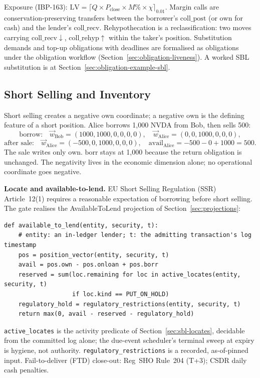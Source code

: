 Exposure (IBP-163): $\mathrm{LV} = \lceil Q\times P_{\mathrm{close}}\times M\%\times\chi\rceil_{0.01}$. Margin calls are conservation-preserving transfers between the borrower's $\mathrm{coll\_post}$ (or $\mathrm{own}$ for cash) and the lender's $\mathrm{coll\_recv}$. Rehypothecation is a reclassification: two moves carrying $\mathrm{coll\_recv}\downarrow$, $\mathrm{coll\_rehyp}\uparrow$ within the taker's position. Substitution demands and top-up obligations with deadlines are formalised as obligations under the obligation workflow (Section~\ref{sec:obligation-liveness}). A worked SBL substitution is at Section~\ref{sec:obligation-example-sbl}.

\subsection{Short Selling and Inventory}
\label{sec:sbl-short-selling}

Short selling creates a negative $\mathrm{own}$ coordinate; a negative $\mathrm{own}$ is the defining feature of a short position. Alice borrows 1{,}000 NVDA from Bob, then sells 500:
\[
\text{borrow:}\quad \vec{w}_{\mathrm{Bob}} = (1000,1000,0,0,0,0),\quad \vec{w}_{\mathrm{Alice}} = (0,0,1000,0,0,0),
\]
\[
\text{after sale:}\quad \vec{w}_{\mathrm{Alice}} = (-500,0,1000,0,0,0),\quad \mathrm{avail}_{\mathrm{Alice}} = -500-0+1000 = 500.
\]
The sale writes only $\mathrm{own}$. $\mathrm{borr}$ stays at 1{,}000 because the return obligation is unchanged. The negativity lives in the economic dimension alone; no operational coordinate goes negative.

\noindent\textbf{Locate and available-to-lend.} EU Short Selling Regulation (SSR) Article~12(1) requires a reasonable expectation of borrowing before short selling. The gate realises the AvailableToLend projection of Section~\ref{sec:projections}:
\begin{lstlisting}
def available_to_lend(entity, security, t):
    # entity: an in-ledger lender; t: the admitting transaction's log timestamp
    pos = position_vector(entity, security, t)
    avail = pos.own - pos.onloan + pos.borr
    reserved = sum(loc.remaining for loc in active_locates(entity, security, t)
                   if loc.kind == PUT_ON_HOLD)
    regulatory_hold = regulatory_restrictions(entity, security, t)
    return max(0, avail - reserved - regulatory_hold)
\end{lstlisting}
\texttt{active\_locates} is the activity predicate of Section~\ref{sec:sbl-locates}, decidable from the committed log alone; the due-event scheduler's terminal sweep at expiry is hygiene, not authority. \texttt{regulatory\_restrictions} is a recorded, as-of-pinned input. Fail-to-deliver (FTD) close-out: Reg~SHO Rule~204 (T+3); CSDR daily cash penalties.

